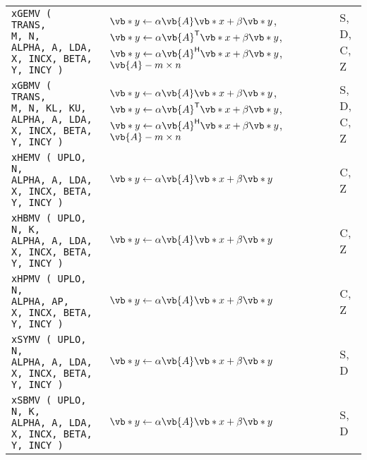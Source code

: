 \documentclass[10pt,a3paper, landscape]{article}
\newcommand{\T}{\mathsf{T}}
\renewcommand{\H}{\mathsf{H}}
\begin{document}
\begin{tabular}{lll}
		\verb|xGEMV (       TRANS,       M, N,         ALPHA, A, LDA, X, INCX, BETA,  Y, INCY )        | & $\vb*{y} \gets \alpha \vb{A} \vb*{x} + \beta \vb*{y}$, $\vb*{y} \gets \alpha \vb{A}^{\T} \vb*{x} + \beta \vb*{y}$, $\vb*{y} \gets \alpha \vb{A}^{\H} \vb*{x} + \beta \vb*{y}$, $\vb{A} - m\times n$                                                          & S, D, C, Z         \\
		\verb|xGBMV (       TRANS,       M, N, KL, KU, ALPHA, A, LDA, X, INCX, BETA,  Y, INCY )        | & $\vb*{y} \gets \alpha \vb{A} \vb*{x} + \beta \vb*{y}$, $\vb*{y} \gets \alpha \vb{A}^{\T} \vb*{x} + \beta \vb*{y}$, $\vb*{y} \gets \alpha \vb{A}^{\H} \vb*{x} + \beta \vb*{y}$, $\vb{A} - m\times n$                                                          & S, D, C, Z         \\
		\verb|xHEMV ( UPLO,                 N,         ALPHA, A, LDA, X, INCX, BETA,  Y, INCY )        | & $\vb*{y} \gets \alpha \vb{A} \vb*{x} + \beta \vb*{y}$                                                                                                                                                                                                        & C, Z               \\
		\verb|xHBMV ( UPLO,                 N, K,      ALPHA, A, LDA, X, INCX, BETA,  Y, INCY )        | & $\vb*{y} \gets \alpha \vb{A} \vb*{x} + \beta \vb*{y}$                                                                                                                                                                                                        & C, Z               \\
		\verb|xHPMV ( UPLO,                 N,         ALPHA, AP,     X, INCX, BETA,  Y, INCY )        | & $\vb*{y} \gets \alpha \vb{A} \vb*{x} + \beta \vb*{y}$                                                                                                                                                                                                        & C, Z               \\
		\verb|xSYMV ( UPLO,                 N,         ALPHA, A, LDA, X, INCX, BETA,  Y, INCY )        | & $\vb*{y} \gets \alpha \vb{A} \vb*{x} + \beta \vb*{y}$                                                                                                                                                                                                        & S, D               \\
		\verb|xSBMV ( UPLO,                 N, K,      ALPHA, A, LDA, X, INCX, BETA,  Y, INCY )        | & $\vb*{y} \gets \alpha \vb{A} \vb*{x} + \beta \vb*{y}$                                                                                                                                                                                                        & S, D               \\

\end{tabular}
\end{document}
